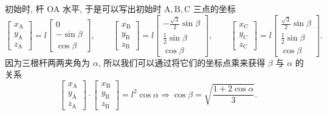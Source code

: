 \documentclass{article}
\begin{document}
初始时, 杆 OA 水平, 于是可以写出初始时 $\mathrm A,\mathrm B,\mathrm C$ 三点的坐标
\begin{equation}
	\left[\begin{matrix}x_\mathrm A\\y_\mathrm A\\z_\mathrm A\end{matrix}\right]=
	l\left[\begin{matrix}0\\-\sin\beta\\\cos\beta\end{matrix}\right],\qquad
	\left[\begin{matrix}x_\mathrm B\\y_\mathrm B\\z_\mathrm B\end{matrix}\right]=
	l\left[\begin{matrix}-\frac{\sqrt3}2\sin\beta\\\frac12\sin\beta\\\cos\beta\end{matrix}\right],\qquad
	\left[\begin{matrix}x_\mathrm C\\y_\mathrm C\\z_\mathrm C\end{matrix}\right]=
	l\left[\begin{matrix}\frac{\sqrt3}2\sin\beta\\\frac12\sin\beta\\\cos\beta\end{matrix}\right].
\end{equation}
因为三根杆两两夹角为 $\alpha$, 所以我们可以通过将它们的坐标点乘来获得 $\beta$ 与 $\alpha$ 的关系
\begin{equation}
	\label{eq:beta关于alpha}
	\left[\begin{matrix}x_\mathrm A\\y_\mathrm A\\z_\mathrm A\end{matrix}\right]\cdot
	\left[\begin{matrix}x_\mathrm B\\y_\mathrm B\\z_\mathrm B\end{matrix}\right]=
	l^2\cos\alpha\Rightarrow
	\cos\beta=\sqrt{\frac{1+2\cos\alpha}3}.
\end{equation}
\end{document}
